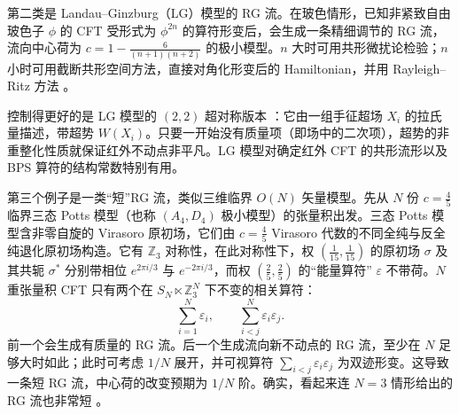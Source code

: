 
第二类是 Landau--Ginzburg（LG）模型的 RG 流。在玻色情形，已知非紧致自由玻色子 $\phi$ 的 CFT 受形式为 $\phi^{2n}$ 的算符形变后，会生成一条精细调节的 RG 流，流向中心荷为 $c=1-\frac{6}{(n+1)(n+2)}$ 的极小模型。$n$ 大时可用共形微扰论检验；$n$ 小时可用截断共形空间方法，直接对角化形变后的 Hamiltonian，并用 Rayleigh--Ritz 方法 \cite{r50,r51,r52}。


控制得更好的是 LG 模型的 $(2,2)$ 超对称版本 \cite{r53}：它由一组手征超场 $X_i$ 的拉氏量描述，带超势 $W(X_i)$。只要一开始没有质量项（即场中的二次项），超势的非重整化性质就保证红外不动点非平凡。LG 模型对确定红外 CFT 的共形流形以及 BPS 算符的结构常数特别有用。

第三个例子是一类“短”RG 流，类似三维临界 $O(N)$ 矢量模型。先从 $N$ 份 $c=\frac45$ 临界三态 Potts 模型（也称 $(A_4,D_4)$ 极小模型）的张量积出发。三态 Potts 模型含非零自旋的 Virasoro 原初场，它们由 $c=\frac45$ Virasoro 代数的不同全纯与反全纯退化原初场构造。它有 $\mathbb{Z}_3$ 对称性，在此对称性下，权 $(\frac1{15},\frac1{15})$ 的原初场 $\sigma$ 及其共轭 $\sigma^*$ 分别带相位 $e^{2\pi i/3}$ 与 $e^{-2\pi i/3}$，而权 $(\frac25,\frac25)$ 的“能量算符” $\varepsilon$ 不带荷。$N$ 重张量积 CFT 只有两个在 $S_N\ltimes\mathbb{Z}_3^N$ 下不变的相关算符：
\begin{equation}
  \label{eq:4-46}
  \sum_{i=1}^{N}\varepsilon_i,\qquad \sum_{i<j}^{N}\varepsilon_i\varepsilon_j.
\end{equation}
前一个会生成有质量的 RG 流。后一个生成流向新不动点的 RG 流，至少在 $N$ 足够大时如此；此时可考虑 $1/N$ 展开，并可视算符 $\sum_{i<j}\varepsilon_i\varepsilon_j$ 为双迹形变。这导致一条短 RG 流，中心荷的改变预期为 $1/N$ 阶。确实，看起来连 $N=3$ 情形给出的 RG 流也非常短 \cite{r54}。


